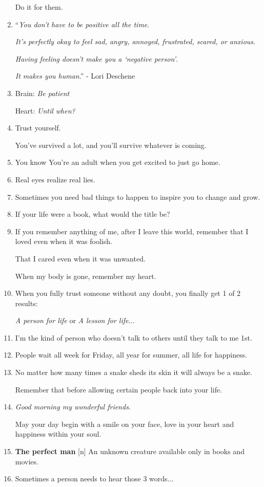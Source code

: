 \documentclass{article}
\begin{document}
\begin{enumerate}
	Do it for them.
	\item ``\textit{You don't have to be positive all the time}.
	
	\textit{It's perfectly okay to feel sad, angry, annoyed, frustrated, scared, or anxious}.
	
	\textit{Having feeling doesn't make you a `negative person'}.
	
	\textit{It makes you human}.'' - Lori Deschene
	\item Brain: \textit{Be patient}
	
	Heart: \textit{Until when?}
	\item Trust yourself.
	
	You've survived a lot, and you'll survive whatever is coming.
	\item You know You're an adult when you get excited to just go home.
	\item Real eyes realize real lies.
	\item Sometimes you need bad things to happen to inspire you to change and grow.
	\item If your life were a book, what would the title be?
	\item If you remember anything of me, after I leave this world, remember that I loved even when it was foolish.
	
	That I cared even when it was unwanted.
	
	When my body is gone, remember my heart.
	\item When you fully trust someone without any doubt, you finally get 1 of 2 results:
	
	\textit{A person for life} or \textit{A lesson for life}$\ldots$
	\item I'm the kind of person who doesn't talk to others until they talk to me 1st.
	\item People wait all week for Friday, all year for summer, all life for happiness.
	\item No matter how many times a snake sheds its skin it will always be a snake.
	
	Remember that before allowing certain people back into your life.
	\item \textit{Good morning my wonderful friends}.
	
	May your day begin with a smile on your face, love in your heart and happiness within your soul.
	\item \textbf{The perfect man} [n] An unknown creature available only in books and movies.
	\item Sometimes a person needs to hear those 3 words$\ldots$
	

\end{enumerate}
\end{document}
